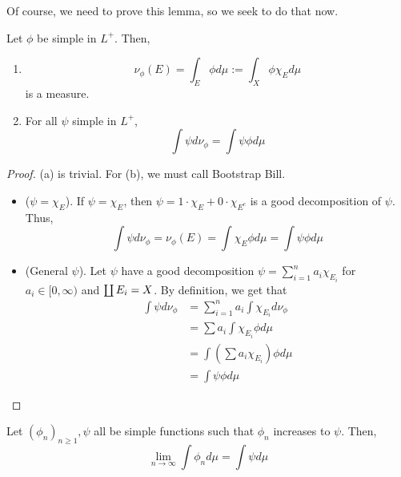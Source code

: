 \documentclass[11pt,leqno,oneside]{amsbook}
\numberwithin{thm}{section}
\begin{document}
Of course, we need to prove this lemma, so we seek to do that now.
\begin{prop}
  Let $\phi$ be simple in $L^+$. Then,
  \begin{enumerate}
  \item \[
      \nu_\phi(E) = \int_E \phi d\mu := \int_X \phi \chi_E d\mu
    \]
    is a measure.
  \item For all $\psi$ simple in $L^+$, \[
      \int \psi d\nu_\phi = \int \psi \phi d \mu
    \]
  \end{enumerate}
  \begin{proof}
    (a) is trivial. For (b), we must call Bootstrap Bill.
    \begin{itemize}
    \item ($\psi = \chi_E$). If $\psi = \chi_E$, then $\psi = 1 \cdot
      \chi_E + 0 \cdot \chi_{E^c}$ is a good decomposition of
      $\psi$. Thus, \[
        \int \psi d\nu_\phi = \nu_\phi(E) = \int \chi_E \phi d \mu =
        \int \psi \phi d\mu
      \]
    \item (General $\psi$). Let $\psi$ have a good decomposition $\psi
      = \sum_{i=1}^n a_i \chi_{E_i}$ for $a_i \in [0,\infty)$ and
      $\coprod E_i = X$. By definition, we get that
      \begin{align*}
        \int \psi d\nu_\phi & = \sum_{i=1}^n a_i \int \chi_{E_i} d
                         \nu_\phi \\
                       & = \sum a_i \int \chi_{E_i} \phi d\mu \\
                       & = \int \left( \sum a_i \chi_{E_i} \right)
                         \phi d\mu \\
        & = \int \psi \phi d\mu
      \end{align*}
    \end{itemize}
  \end{proof}
\end{prop}
\begin{prop}
  Let \((\phi_n)_{n \geq 1}, \psi\) all be simple functions such that
  \(\phi_n\) increases to \(\psi\). Then, \[
    \lim_{n \to \infty} \int \phi_n d\mu = \int \psi d\mu
  \]
\end{prop}
\end{document}
